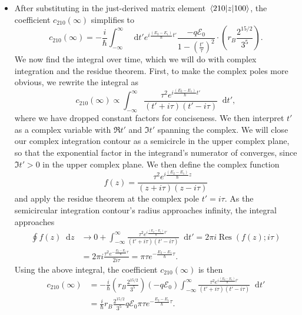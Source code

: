 \documentclass[11pt, a4paper]{article}
\newcommand{\diff}{\mathop{}\!\mathrm{d}} %
\newcommand{\E}{\mathcal{E}}  %
\begin{document}
\begin{itemize}
	\item After substituting in the just-derived matrix element $ \mel{210}{z}{100} $, the coefficient $ c_{210}(\infty) $ simplifies to
	\begin{equation*}
		c_{210}(\infty) = - \frac{i}{\hbar}\int_{-\infty}^{\infty} \diff t' e^{i \frac{(E_{2} - E_{1})}{\hbar}t'} \frac{-q\E_{0}}{1 - \left(\frac{t'}{\tau}\right)^{2}} \cdot \left(r_{B}\frac{2^{15/2}}{3^{5}}\right) .
	\end{equation*}
	We now find the integral over time, which we will do with complex integration and the residue theorem. First, to make the complex poles more obvious, we rewrite the integral as
	\begin{equation*}
		c_{210}(\infty) \propto \int_{-\infty}^{\infty} \frac{\tau^{2} e^{i\frac{(E_{2}-E_{1})}{\hbar}t'}}{(t' + i \tau)(t' - i \tau)} \diff t',
	\end{equation*}
	where we have dropped constant factors for conciseness.	We then interpret $ t' $ as a complex variable with $ \Re t' $ and $ \Im t' $ spanning the complex. We will close our complex integration contour as a semicircle in the upper complex plane, so that the exponential factor in the integrand's numerator of converges, since $ \Im t' > 0 $ in the upper complex plane. We then define the complex function
	\begin{equation*}
		f(z) = \frac{\tau^{2} e^{i\frac{(E_{2}-E_{1})}{\hbar}z}}{(z + i \tau)(z - i \tau)}
	\end{equation*}
	and apply the residue theorem at the complex pole $ t' = i \tau $. As the semicircular integration contour's radius approaches infinity, the integral approaches
	\begin{align*}
		\oint f(z) \diff z &\to 0 + \int_{-\infty}^{\infty} \frac{\tau^{2} e^{i\frac{(E_{2}-E_{1})}{\hbar}t'} }{(t' + i \tau)(t' - i \tau)} \diff t' = 
		 2\pi i \operatorname{Res}(f(z); i \tau) \\[1mm]
		& = 2\pi i \frac{\tau^{2}e^{-\frac{E_{2} - E_{1}}{\hbar}\tau}}{2i \tau} = \pi \tau e^{-\frac{E_{2} - E_{1}}{\hbar}\tau}.
	\end{align*}
	Using the above integral, the coefficient $ c_{210}(\infty) $ is then
	\begin{align*}
		c_{210}(\infty) &= -\frac{i}{\hbar}\left(r_{B}\frac{2^{15/2}}{3^{5}}\right) (-q\E_{0}) \int_{-\infty}^{\infty} \frac{\tau^{2} e^{i\frac{(E_{2}-E_{1})}{\hbar}t'}}{(t' + i \tau)(t' - i \tau)} \diff t'\\
		 & = \frac{i}{\hbar} r_{B} \frac{2^{15/2}}{3^{5}}q \E_{0} \pi \tau e^{-\frac{E_{2} - E_{1}}{\hbar}\tau}.
	\end{align*}
	

\end{itemize}
\end{document}
